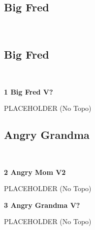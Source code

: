 \begin{multicols}{2}
		\section{Big Fred}\label{sa:Big Fred}
	\
			\subsection*{Big Fred}\label{bf:Big Fred}
			\
			
					\label{rt:Big Fred} \colorbox{black!20}{\textbf{1 Big Fred V?  }}
					\begin{adjustwidth}{1cm}{}
					PLACEHOLDER
						\newline (No Topo) 
					\end{adjustwidth}
			\subsection*{Angry Grandma}\label{bf:Angry Grandma}
			\
			
					\label{rt:Angry Mom} \colorbox{green!20}{\textbf{2 Angry Mom V2  }}
					\begin{adjustwidth}{1cm}{}
					PLACEHOLDER
						\newline (No Topo) 
					\end{adjustwidth}
					\label{rt:Angry Grandma} \colorbox{black!20}{\textbf{3 Angry Grandma V?  }}
					\begin{adjustwidth}{1cm}{}
					PLACEHOLDER
						\newline (No Topo) 
					\end{adjustwidth}
\end{multicols}
\clearpage